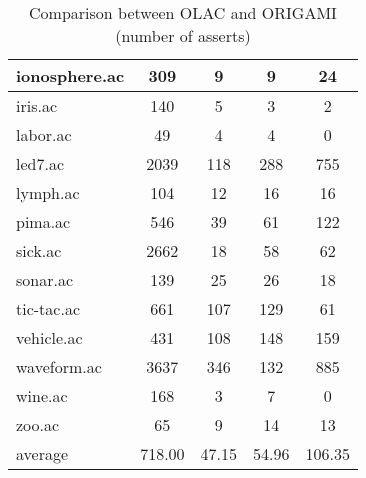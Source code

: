 \begin{table}[htbp]
\begin{tabular}{|l|c|c|c|c|}
		\hline
		ionosphere.ac   & 309           & 9                  & 9                        & 24                            \\
		\hline
		iris.ac         & 140           & 5                  & 3                        & 2                             \\
		\hline
		labor.ac        & 49            & 4                  & 4                        & 0                             \\
		\hline
		led7.ac         & 2039          & 118                & 288                      & 755                           \\
		\hline
		lymph.ac        & 104           & 12                 & 16                       & 16                            \\
		\hline
		pima.ac         & 546           & 39                 & 61                       & 122                           \\
		\hline
		sick.ac         & 2662          & 18                 & 58                       & 62                            \\
		\hline
		sonar.ac        & 139           & 25                 & 26                       & 18                            \\
		\hline
		tic-tac.ac      & 661           & 107                & 129                      & 61                            \\
		\hline
		vehicle.ac      & 431           & 108                & 148                      & 159                           \\
		\hline
		waveform.ac     & 3637          & 346                & 132                      & 885                           \\
		\hline
		wine.ac         & 168           & 3                  & 7                        & 0                             \\
		\hline
		zoo.ac          & 65            & 9                  & 14                       & 13                            \\
		\hline
		average         & 718.00        & 47.15              & 54.96                    & 106.35                        \\
		\hline
		\end{tabular}
	\caption{Comparison between OLAC and ORIGAMI (number of asserts)}
	\label{tab:comparison_olac_origami}
\end{table}